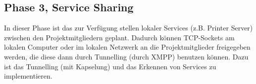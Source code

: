 \subsection{Phase 3, Service Sharing}
In dieser Phase ist das zur Verfügung stellen lokaler Services (z.B. Printer Server) zwischen den
Projektmitgliedern geplant. Dadurch können TCP-Sockets am lokalen Computer oder im lokalen Netzwerk
an die Projektmitglieder freigegeben werden, die diese dann durch Tunnelling (durch XMPP) benutzen
können. Dazu ist das Tunnelling (mit Kapselung) und das Erkennen von Services zu implementieren.


